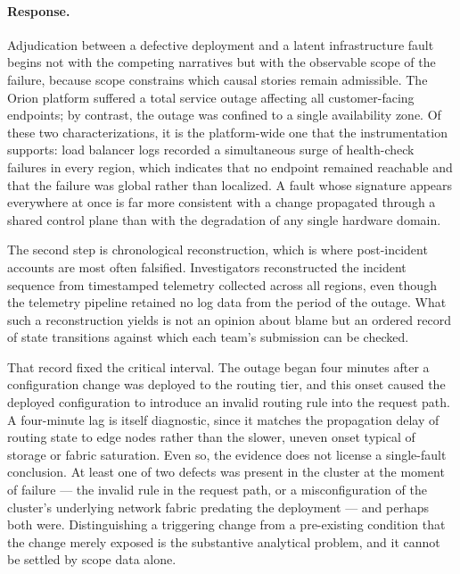 \documentclass[11pt]{article}
\begin{document}
\paragraph{Response.} {\small Adjudication between a defective deployment and a latent infrastructure fault begins not with the competing narratives but with the observable scope of the failure, because scope constrains which causal stories remain admissible. The Orion platform suffered a total service outage affecting all customer-facing endpoints; by contrast, the outage was confined to a single availability zone. Of these two characterizations, it is the platform-wide one that the instrumentation supports: load balancer logs recorded a simultaneous surge of health-check failures in every region, which indicates that no endpoint remained reachable and that the failure was global rather than localized. A fault whose signature appears everywhere at once is far more consistent with a change propagated through a shared control plane than with the degradation of any single hardware domain.

The second step is chronological reconstruction, which is where post-incident accounts are most often falsified. Investigators reconstructed the incident sequence from timestamped telemetry collected across all regions, even though the telemetry pipeline retained no log data from the period of the outage. What such a reconstruction yields is not an opinion about blame but an ordered record of state transitions against which each team's submission can be checked.

That record fixed the critical interval. The outage began four minutes after a configuration change was deployed to the routing tier, and this onset caused the deployed configuration to introduce an invalid routing rule into the request path. A four-minute lag is itself diagnostic, since it matches the propagation delay of routing state to edge nodes rather than the slower, uneven onset typical of storage or fabric saturation. Even so, the evidence does not license a single-fault conclusion. At least one of two defects was present in the cluster at the moment of failure — the invalid rule in the request path, or a misconfiguration of the cluster's underlying network fabric predating the deployment — and perhaps both were. Distinguishing a triggering change from a pre-existing condition that the change merely exposed is the substantive analytical problem, and it cannot be settled by scope data alone.

}
\end{document}
